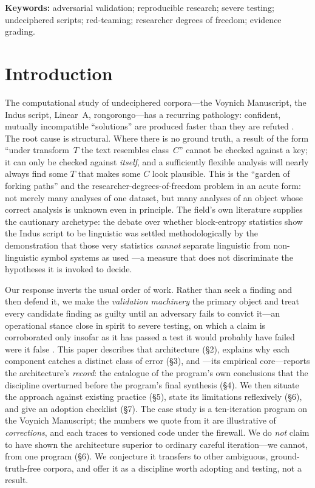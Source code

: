 \documentclass[11pt]{article}
\begin{document}
\noindent\textbf{Keywords:} adversarial validation; reproducible research; severe testing;
undeciphered scripts; red-teaming; researcher degrees of freedom; evidence grading.

\section{Introduction}
The computational study of undeciphered corpora---the Voynich Manuscript, the Indus script,
Linear~A, rongorongo---has a recurring pathology: confident, mutually incompatible
``solutions'' are produced faster than they are refuted \citep{reddy2011know,
bowern2021linguistics}. The root cause is structural. Where there is no ground truth, a
result of the form ``under transform~$T$ the text resembles class~$C$'' cannot be checked
against a key; it can only be checked against \emph{itself}, and a sufficiently flexible
analysis will nearly always find some $T$ that makes some $C$ look plausible. This is the
``garden of forking paths'' \citep{gelman2013garden} and the researcher-degrees-of-freedom
problem \citep{simmons2011false} in an acute form: not merely many analyses of one dataset,
but many analyses of an object whose correct analysis is unknown even in principle. The
field's own literature supplies the cautionary archetype: the debate over whether
block-entropy statistics show the Indus script to be linguistic \citep{rao2009entropic} was
settled methodologically by the demonstration that those very statistics \emph{cannot}
separate linguistic from non-linguistic symbol systems as used \citep{sproat2014statistical}
---a measure that does not discriminate the hypotheses it is invoked to decide.

Our response inverts the usual order of work. Rather than seek a finding and then defend it,
we make the \emph{validation machinery} the primary object and treat every candidate finding
as guilty until an adversary fails to convict it---an operational stance close in spirit to
severe testing, on which a claim is corroborated only insofar as it has passed a test it
would probably have failed were it false \citep{mayo2018severe}. This paper describes that
architecture (\S2), explains why each component catches a distinct class of error (\S3), and
---its empirical core---reports the architecture's \emph{record}: the catalogue of the
program's own conclusions that the discipline overturned before the program's final synthesis
(\S4). We then situate the approach against existing practice (\S5), state its limitations
reflexively (\S6), and give an adoption checklist (\S7). The case study is a ten-iteration
program on the Voynich Manuscript; the numbers we quote from it are illustrative of
\emph{corrections}, and each traces to versioned code under the firewall. We do \emph{not}
claim to have shown the architecture superior to ordinary careful iteration---we cannot, from
one program (\S6). We conjecture it transfers to other ambiguous, ground-truth-free corpora,
and offer it as a discipline worth adopting and testing, not a result.
\end{document}
